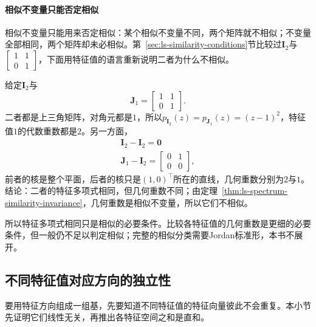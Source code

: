 \paragraph{相似不变量只能否定相似}
相似不变量只能用来否定相似：某个相似不变量不同，两个矩阵就不相似；不变量全部相同，两个矩阵却未必相似。第~\ref{sec:ls-similarity-conditions}节比较过$\bm I_2$与$\left[\begin{smallmatrix}1&1\\0&1\end{smallmatrix}\right]$，下面用特征值的语言重新说明二者为什么不相似。
\begin{example}[反例：特征多项式相同而不相似]
\label{ex:ls-same-charpoly-not-similar}
给定$\bm I_2$与
\[
 \bm J_1=\begin{bmatrix}1&1\\0&1\end{bmatrix}.
\]
二者都是上三角矩阵，对角元都是$1$，所以$p_{\bm I_2}(z)=p_{\bm J_1}(z)=(z-1)^2$，特征值$1$的代数重数都是$2$。另一方面，
\[
\begin{gathered}
\bm I_2-\bm I_2=\bm0\\
\bm J_1-\bm I_2=\begin{bmatrix}0&1\\0&0\end{bmatrix},
\end{gathered}
\]
前者的核是整个平面，后者的核只是$(1,0)^{\top}$所在的直线，几何重数分别为$2$与$1$。结论：二者的特征多项式相同，但几何重数不同；由定理~\ref{thm:ls-spectrum-similarity-invariance}，几何重数是相似不变量，所以它们不相似。
\end{example}
所以特征多项式相同只是相似的必要条件。比较各特征值的几何重数是更细的必要条件，但一般仍不足以判定相似；完整的相似分类需要Jordan标准形，本书不展开。

\subsection{不同特征值对应方向的独立性}
\label{sec:ls-eigenvector-independence}

要用特征方向组成一组基，先要知道不同特征值的特征向量彼此不会重复。本小节先证明它们线性无关，再推出各特征空间之和是直和。


